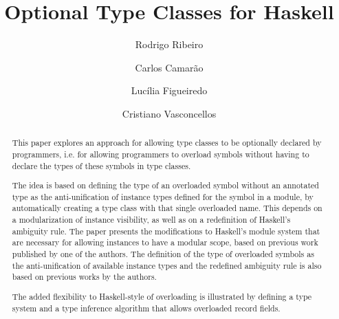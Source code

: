 \documentclass{llncs}
\begin{document}
%



%
\mainmatter              %

\title{Optional Type Classes for Haskell}

%
\author{Rodrigo Ribeiro  \and Carlos Camar\~ao \and Luc\'ilia
Figueiredo \and Cristiano Vasconcellos}
\maketitle              %

\begin{abstract}

This paper explores an approach for allowing type classes to be
optionally declared by programmers, i.e. for allowing programmers to
overload symbols without having to declare the types of these symbols
in type classes.

The idea is based on defining the type of an overloaded symbol without
an annotated type as the anti-unification of instance types defined for
the symbol in a module, by automatically creating a type class with
that single overloaded name. This depends on a modularization of
instance visibility, as well as on a redefinition of Haskell's
ambiguity rule. The paper presents the modifications to Haskell's
module system that are necessary for allowing instances to have a
modular scope, based on previous work published by one of the
authors. The definition of the type of overloaded symbols as the
anti-unification of available instance types and the redefined
ambiguity rule is also based on previous works by the authors.

The added flexibility to Haskell-style of overloading is illustrated
by defining a type system and a type inference algorithm that allows
overloaded record fields.


\end{abstract}







% 





% 





\end{document}
